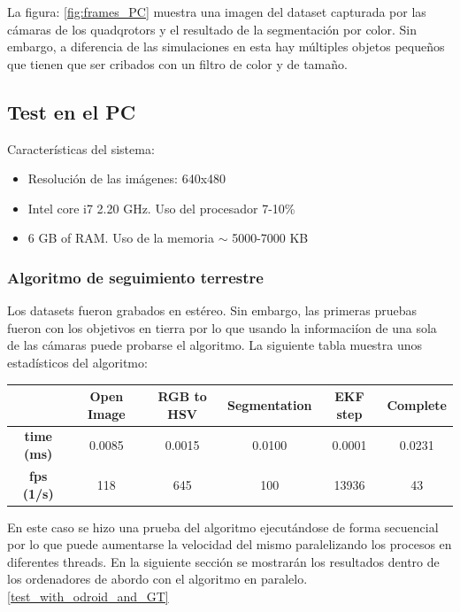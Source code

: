 	La figura: \ref{fig:frames_PC} muestra una imagen del dataset capturada por las c\'amaras de los quadqrotors y el resultado de la segmentaci\'on por color. Sin embargo, a diferencia de las simulaciones en esta hay m\'ultiples objetos pequeños que tienen que ser cribados con un filtro de color y de tama\~no.

\subsection{Test en el PC}
	Caracter\'isticas del sistema:
	\begin{itemize}
		\item{Resoluci\'on de las im\'agenes: 640x480}
		\item{Intel core i7 2.20 GHz. Uso del procesador 7-10\%}
		\item{6 GB of RAM. Uso de la memoria $\sim$ 5000-7000 KB}
	\end{itemize}
	
	\subsubsection{Algoritmo de seguimiento terrestre}
	
	Los datasets fueron grabados en est\'ereo. Sin embargo, las primeras pruebas fueron con los objetivos en tierra por lo que usando la informaci\'ion de una sola de las c\'amaras puede probarse el algoritmo. La siguiente tabla muestra unos estad\'isticos del algoritmo: \\
	
	{
	\centering
		\begin{tabular}{|c|c|c|c|c||c|}
		\hline  					&  Open Image	&  RGB to HSV 	& Segmentation 	& EKF step  & Complete \\ 
		\hline  \textbf{time (ms)}	& 0.0085 		& 0.0015 		& 0.0100 		& 0.0001 	& 0.0231 	\\ 
		\hline  \textbf{fps (1/s)}	&  118			&  645			&  100			& 13936 	& 43 		\\ 
		\hline 
		\end{tabular} 
	}
	\newline

	{
	\label{Reference_fps_table}
	En este caso se hizo una prueba del algoritmo ejecut\'andose de forma secuencial por lo que puede aumentarse la velocidad del mismo paralelizando los procesos en diferentes threads. En la siguiente secci\'on se mostrar\'an los resultados dentro de los ordenadores de abordo con el algoritmo en paralelo. \ref{test_with_odroid_and_GT}
	}
	
